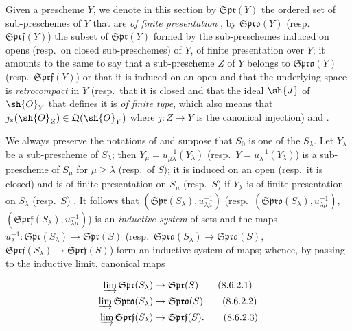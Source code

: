 \begin{env}[8.6.1]
\label{IV.8.6.1}
Given a prescheme $Y$, we denote in this section by $\mathfrak{Spr}(Y)$ the ordered set
 of sub-preschemes of $Y$ that are \emph{of finite presentation}
, by $\mathfrak{Spro}(Y)$ (resp.\ $\mathfrak{Sprf}(Y)$) the subset of $\mathfrak{Spr}(Y)$ formed by the sub-preschemes induced on opens (resp.\ on closed sub-preschemes) of $Y$, of finite presentation over $Y$; it amounts to the same to say that a sub-prescheme $Z$ of $Y$ belongs to $\mathfrak{Spro}(Y)$ (resp.\ $\mathfrak{Sprf}(Y)$) or that it is induced on an open and that the underlying space is \emph{retrocompact} in $Y$ (resp.\ that it is closed and that the ideal $\sh{J}$ of $\sh{O}_Y$ that defines it is \emph{of finite type}, which also means that $j_*(\sh{O}_Z)\in\mathfrak{Q}(\sh{O}_Y)$ where $j:Z\to Y$ is the canonical injection)  and .
\end{env}

\begin{env}[8.6.2]
\label{IV.8.6.2}
We always preserve the notations of  and suppose that $S_0$ is one of the $S_\lambda$.
Let $Y_\lambda$ be a sub-prescheme of $S_\lambda$; then $Y_\mu=u_{\mu\lambda}^{-1}(Y_\lambda)$ (resp.\ $Y=u_\lambda^{-1}(Y_\lambda)$) is a sub-prescheme of $S_\mu$ for $\mu\geqslant\lambda$ (resp.\ of $S$); it is induced on an open (resp.\ it is closed) and is of finite presentation on $S_\mu$ (resp.\ $S$) if $Y_\lambda$ is of finite presentation on $S_\lambda$ (resp.\ $S$) . It follows that $(\mathfrak{Spr}(S_\lambda),u_{\lambda\mu}^{-1})$ (resp.\ $(\mathfrak{Spro}(S_\lambda),u_{\lambda\mu}^{-1})$, $(\mathfrak{Sprf}(S_\lambda),u_{\lambda\mu}^{-1})$) is an \emph{inductive system} of sets and the maps $u_\lambda^{-1}:\mathfrak{Spr}(S_\lambda)\to\mathfrak{Spr}(S)$ (resp.\ $\mathfrak{Spro}(S_\lambda)\to\mathfrak{Spro}(S)$, $\mathfrak{Sprf}(S_\lambda)\to\mathfrak{Sprf}(S)$) form an inductive system of maps; whence, by passing to the inductive limit, canonical maps
\end{env}

\begin{align}
  \varinjlim \mathfrak{Spr}(S_\lambda) &\to \mathfrak{Spr}(S) \tag{8.6.2.1}\label{IV.8.6.2.1}\\
  \varinjlim \mathfrak{Spro}(S_\lambda) &\to \mathfrak{Spro}(S) \tag{8.6.2.2}\label{IV.8.6.2.2}\\
  \varinjlim \mathfrak{Sprf}(S_\lambda) &\to \mathfrak{Sprf}(S). \tag{8.6.2.3}\label{IV.8.6.2.3}
\end{align}

